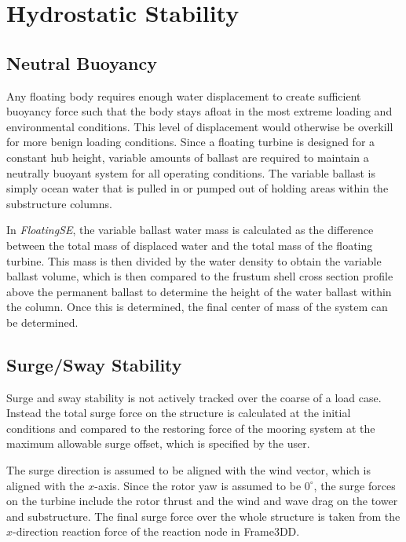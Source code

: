 \section{Hydrostatic Stability}
\label{sec:static}
\subsection{Neutral Buoyancy}
Any floating body requires enough water displacement to create
sufficient buoyancy force such that the body stays afloat in the most
extreme loading and environmental conditions.  This level of
displacement would otherwise be overkill for more benign loading
conditions.  Since a floating turbine is designed for a constant hub
height, variable amounts of ballast are required to maintain a neutrally
buoyant system for all operating conditions.  The variable ballast is
simply ocean water that is pulled in or pumped out of holding areas
within the substructure columns.

In \textit{FloatingSE}, the variable ballast water mass is calculated as
the difference between the total mass of displaced water and the total
mass of the floating turbine.  This mass is then divided by the water
density to obtain the variable ballast volume, which is then compared to
the frustum shell cross section profile above the permanent ballast to
determine the height of the water ballast within the column.  Once this
is determined, the final center of mass of the system can be determined.

\subsection{Surge/Sway Stability}
Surge and sway stability is not actively tracked over the coarse of a
load case.  Instead the total surge force on the structure is calculated
at the initial conditions and compared to the restoring force of the
mooring system at the maximum allowable surge offset, which is specified
by the user.

The surge direction is assumed to be aligned with the wind vector, which
is aligned with the $x$-axis.  Since the rotor yaw is assumed to be
$0^{\circ}$, the surge forces on the turbine include the rotor thrust
and the wind and wave drag on the tower and substructure.  The final
surge force over the whole structure is taken from the $x$-direction
reaction force of the reaction node in Frame3DD.

